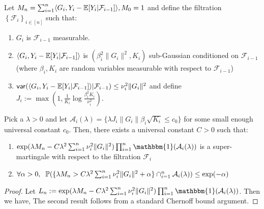 \begin{lemma}
    \label{lemma:martingale_concentration_lemma_appendix}
Let $M_{n} = \sum_{i=1}^{n}\langle G_i, Y_i - \mathbb{E}[Y_i|\mathcal{F}_{i-1}] \rangle, M_{0} = 1$ and define the filtration $\left\{\mathcal{F}_{i}\right\}_{i \in [n]}$ such that:
\begin{enumerate}
    \item  $G_i$ is $\mathcal{F}_{i-1}$ measurable.
    \item  $\langle G_i,Y_i-\mathbb{E} [Y_i|\mathcal{F}_{i-1}]\rangle$ is $(\beta_i^{2}\|G_i\|^{2}, K_i)$ sub-Gaussian conditioned on $\mathcal{F}_{i-1}$ (where $\beta_i,K_i$ are random variables measurable with respect to $\mathcal{F}_{i-1}$)
    \item $\mathsf{var}(\langle G_i, Y_i - \mathbb{E}[Y_i|\mathcal{F}_{i-1}]\rangle|\mathcal{F}_{i-1}) \leq \nu^2_i \|G_i\|^2$ and define $J_i := \max(1,\tfrac{1}{K_i}\log\frac{\beta_i^2 K_i}{\nu^2_i})$.
\end{enumerate}
Pick a $\lambda > 0$ and let $\mathcal{A}_i(\lambda) = \{\lambda J_i\|G_i\|\beta_i\sqrt{K_i} \leq c_0\}$ for some small enough universal constant $c_0$. Then, there exists a universal constant $C > 0$ such that:
\begin{enumerate}
    \item $\exp(\lambda M_{n} - C\lambda^2\sum_{i=1}^{n}\nu_i^2\|G_i\|^2 )\prod_{i=1}^{n}\mathbbm{1}(\mathcal{A}_i(\lambda))$ is a super-martingale with respect to the filtration $\mathcal{F}_{i}$
    \item $\forall \alpha > 0, \;\; \mathbb{P}(\{\lambda M_n > C \lambda^2\sum_{i=1}^{n}\nu_i^2\|G_i\|^2 + \alpha\}\cap_{i=1}^{n} \mathcal{A}_i(\lambda)) \leq \exp(-\alpha)$
\end{enumerate}
\end{lemma}
\begin{proof}
    Let $L_{n} := \exp(\lambda M_{n} - C\lambda^2\sum_{i=1}^{n}\nu_i^2\|G_i\|^2 )\prod_{i=1}^{n}\mathbbm{1}(\mathcal{A}_i(\lambda))$. Then we have, 
    The second result follows from a standard Chernoff bound argument.
\end{proof}

